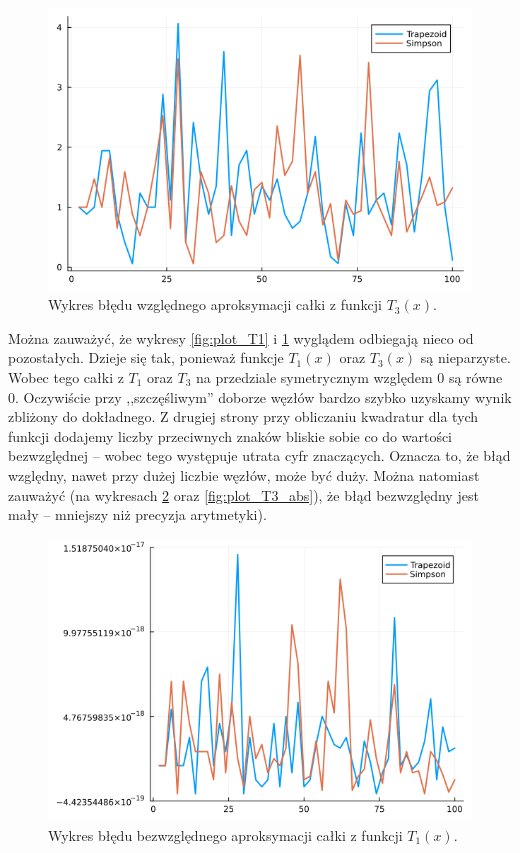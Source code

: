 \documentclass{article}
\theoremstyle{definition}
\begin{document}
\begin{figure}[h!]
    \centering
    \includegraphics[scale=0.5]{plot_T3.png}
    \caption{Wykres błędu względnego aproksymacji całki z funkcji \(T_3(x)\).}
    \label{fig:plot_T3}
\end{figure}

\medskip

\noindent Można zauważyć, że wykresy \ref{fig:plot_T1} i \ref{fig:plot_T3} wyglądem odbiegają nieco od pozostałych. Dzieje się tak, ponieważ funkcje \(T_1(x)\) oraz \(T_3(x)\) są nieparzyste. Wobec tego całki z \(T_1\) oraz \(T_3\) na przedziale symetrycznym względem 0 są równe 0. Oczywiście przy ,,szczęśliwym'' doborze węzłów bardzo szybko uzyskamy wynik zbliżony do dokładnego.  Z drugiej strony przy obliczaniu kwadratur dla tych funkcji dodajemy liczby przeciwnych znaków bliskie sobie co do wartości bezwzględnej -- wobec tego występuje utrata cyfr znaczących. Oznacza to, że błąd względny, nawet przy dużej liczbie węzłów, może być duży. Można natomiast zauważyć (na wykresach \ref{fig:plot_T1_abs} oraz \ref{fig:plot_T3_abs}), że błąd bezwzględny jest mały -- mniejszy niż precyzja arytmetyki).


\begin{figure}[h!]
    \centering
    \includegraphics[scale=0.5]{plot_T1_abs.png}
    \caption{Wykres błędu bezwzględnego aproksymacji całki z funkcji \(T_1(x)\).}
    \label{fig:plot_T1_abs}
\end{figure}
\end{document}
